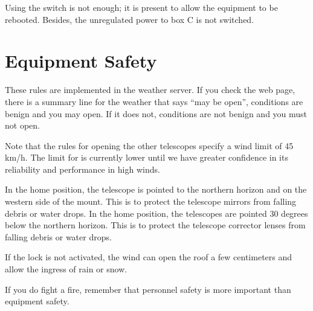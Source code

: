 Using the switch is not enough; it is present to allow the equipment to be rebooted. Besides, the unregulated power to box C is not switched.



\section{Equipment Safety}


These rules are implemented in the {\projectname} weather server. If you check the {\projectname} web page, there is a summary line for the weather that says “may be open”, conditions are benign and you may open. If it does not, conditions are not benign and you must not open.

Note that the rules for opening the other telescopes specify a wind limit of 45 km/h. The limit for {\projectname} is currently lower until we have greater confidence in its reliability and performance in high winds.


\ifcoatlioan
In the home position, the telescope is pointed to the northern horizon and on the western side of the mount. This is to protect the telescope mirrors from falling debris or water drops.
\fi
\ifddotioan
In the home position, the telescopes are pointed 30 degrees below the northern horizon. This is to protect the telescope corrector lenses from falling debris or water drops.
\fi



If the lock is not activated, the wind can open the roof a few centimeters and allow the ingress of rain or snow.


If you do fight a fire, remember that personnel safety is more important than equipment safety.

